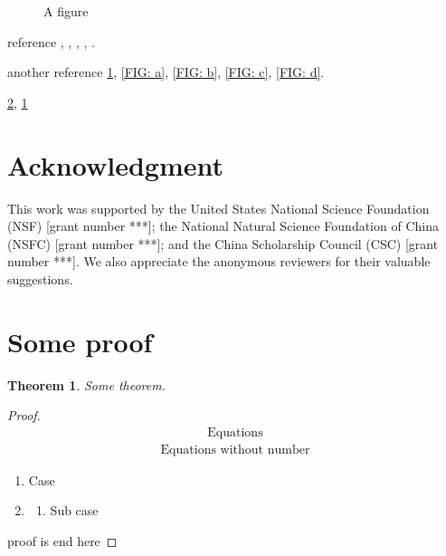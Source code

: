 \documentclass[3p, review]{elsarticle}
\newtheorem{theorem}{Theorem}
\begin{document}
\begin{figure}[!htp]
\begin{minipage}[b]{.235\textwidth}
{                                \label{FIG: d}
                                }
                \end{minipage}
        \caption{A figure 
        }
        \label{FIG: all}
\end{figure}

reference , , , , .

another reference \cref{FIG: all}, \cref{FIG: a}, \cref{FIG: b}, \cref{FIG: c}, \cref{FIG: d}.

\ref{POOF: name}, \cref{THEOREM: name}


\section{Acknowledgment}

This work was supported by 
the United States National Science Foundation (NSF) [grant number ***]; 
the National Natural Science Foundation of China (NSFC) [grant number ***]; 
and the China Scholarship Council (CSC) [grant number ***].
We also appreciate the anonymous reviewers for their valuable suggestions.

\appendix

\section{Some proof} \label{POOF: name}

\begin{theorem} \label{THEOREM: name}
        Some theorem.
\end{theorem}

\begin{proof}        
        \begin{align}
                \text{Equations}
        \end{align}
        \begin{align*}
                \text{Equations without number}
        \end{align*}
        \begin{enumerate}
                \item Case
                \item \label{case 2} 
                \begin{enumerate}
                        \item Sub case
                \end{enumerate}
        \end{enumerate}
        proof is end here
\end{proof}
\end{document}
